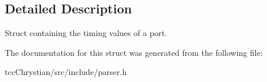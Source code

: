 \subsection{Detailed Description}
Struct containing the timing values of a port. 

The documentation for this struct was generated from the following file\-:\begin{DoxyCompactItemize}
\item 
tcc\-Chrystian/src/include/parser.\-h\end{DoxyCompactItemize}
